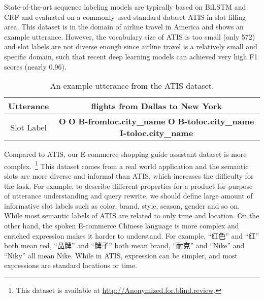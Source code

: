State-of-the-art sequence labeling models are typically based on 
BiLSTM and CRF \cite{huang2015bidirectional,reimers2017optimal}
and evaluated on a commonly used standard dataset ATIS \cite{price1990evaluation} in slot filling area.
This dataset is in the domain of airline travel in America and
 shows an example utterance.
However,
the vocabulary size of ATIS is too small (only 572)
and slot labels are not diverse enough
since airline travel is a relatively small and specific domain,
such that recent deep learning models can achieved very high F1 scores
(nearly 0.96).
\begin{table}[h]
	\caption{An example utterance from the ATIS dataset.}
	\label{tab:slot-filling-demo-atis}
	\centering
	\scriptsize
	\begin{tabular}{c|c}
		\toprule
		Utterance & flights from Dallas to New York \\
		\midrule
		Slot Label & \textbf{O}  \textbf{O}  \textbf{B-fromloc.city\_name}  \textbf{O}  \textbf{B-toloc.city\_name}  \textbf{I-toloc.city\_name}  \\
		\bottomrule
	\end{tabular}
	\vspace{-10pt}
\end{table}

Compared to ATIS, our E-commerce shopping guide assistant dataset is 
more complex.~\footnote{This dataset is available at \url{http://Anonymized.for.blind.review}.}
This dataset comes from a real world application and the
semantic slots are more diverse and informal than ATIS, 
which increases the difficulty for the task.
For example, to describe different properties for a product for purpose of utterance understanding and query rewrite,
we should define large amount of informative slot labels such as color, brand, style, season, gender and so on.
While most semantic labels of ATIS are related to only time and location.
On the other hand, the spoken E-commerce Chinese language is more complex and enriched expression makes it harder to understand.
For example, ``红色'' and ``红'' both mean red, ``品牌'' and ``牌子'' both mean brand, ``耐克'' and ``Nike'' and ``Niky'' all mean Nike.
While in ATIS, expression can be simpler, and most expressions are standard locations or time.

